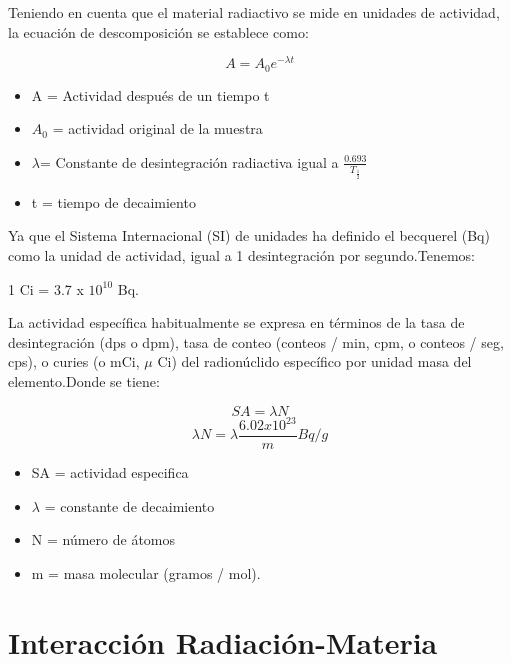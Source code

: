 \documentclass[12pt,fleqn]{book} %
\numberwithin{equation}{section} %
\numberwithin{figure}{section} %
\numberwithin{table}{section} %
\begin{document}
Teniendo en cuenta que el material radiactivo se mide en unidades de actividad, la ecuación de descomposición se establece como:

\begin{equation}
A = A_{0}  e^{-\lambda t} 
\end{equation}

\begin{itemize}
\item A = Actividad después de un tiempo t
\item $A_{0}$ = actividad original de la muestra
\item $\lambda$= Constante de desintegración radiactiva igual a $\frac{0.693}{T_{\frac{1}{2}}}$
\item t = tiempo de decaimiento
  \end{itemize}

Ya que el Sistema Internacional (SI) de unidades ha definido el becquerel (Bq) como la unidad de actividad, igual a 1 desintegración por segundo.Tenemos:

1 Ci = 3.7 x $10^{10}$ Bq.

La actividad específica habitualmente se expresa en términos de la tasa de desintegración (dps o dpm), tasa de conteo (conteos / min, cpm, o conteos / seg, cps), o curies (o mCi, $\mu$ Ci) del radionúclido específico por unidad masa del elemento.Donde se tiene:

\begin{equation}
 SA=\lambda N
 \end{equation}
\begin{equation}
\lambda N = \lambda \frac{6.02 x 10^{23}}{m} Bq/g  
 \end{equation}

 
 \begin{itemize}
\item  SA = actividad especifica
\item  $\lambda$  = constante de decaimiento
\item N = número de átomos
\item m = masa molecular (gramos / mol).
\end{itemize}


\section{Interacción Radiación-Materia}
\end{document}
